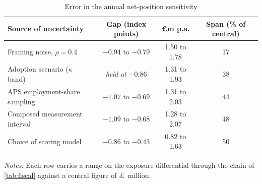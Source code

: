 
\begin{table}[t]
\centering
\caption{Error in the annual net-position sensitivity}
\label{tab:budget}
\small
\begin{tabular}{lccc}
\toprule
Source of uncertainty & Gap (index points) & \pounds m p.a. & Span (\% of central) \\ \midrule Framing noise, $\rho = 0.4$        & $-0.94$ to $-0.79$ & 1.50 to 1.78 & 17 \\ Adoption scenario ($\kappa$ band)  & \textit{held at} $-0.86$ & 1.31 to 1.93 & 38 \\ APS employment-share sampling      & $-1.07$ to $-0.69$ & 1.31 to 2.03 & 44 \\ Composed measurement interval      & $-1.09$ to $-0.68$ & 1.28 to 2.07 & 48 \\ Choice of scoring model            & $-0.86$ to $-0.43$ & 0.82 to 1.63 & 50 \\
\bottomrule
\end{tabular}
\begin{minipage}{0.92\textwidth}
\vspace{0.4em}\footnotesize
\textit{Notes:} Each row carries a range on the exposure differential through the chain of \cref{tab:fiscal} against a central figure of \pounds\fiscCen~million.
\end{minipage}
\end{table}